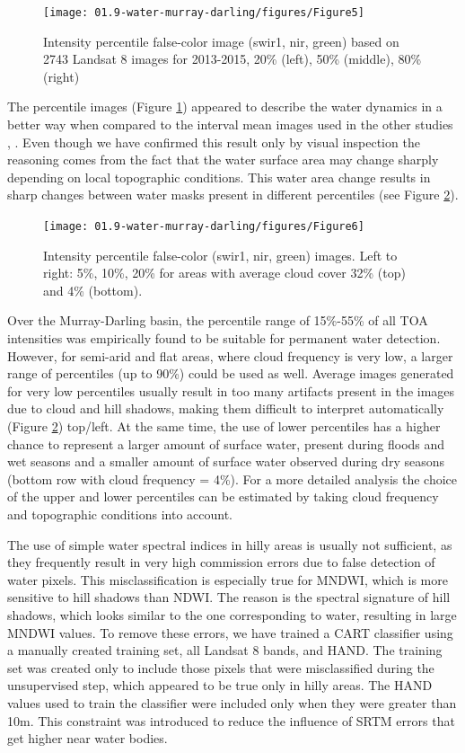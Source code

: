 \begin{figure}
	\centering
	\texttt{[image: 01.9-water-murray-darling/figures/Figure5]}
	\caption{Intensity percentile false-color image (swir1, nir, green) based on 2743 Landsat 8 images for 2013-2015, 20\% (left), 50\% (middle), 80\% (right)}
	\label{fig:au-percentiles}
\end{figure}

The percentile images (Figure \ref{fig:au-percentiles}) appeared to describe the water dynamics in a better way when  compared to the interval mean images used in the other studies \citet{Potapov2012}, \citet{Hansen2013}. Even though we have confirmed this result only by visual inspection the reasoning comes from the fact that the water surface area may change sharply depending on local topographic conditions. This water area change results in sharp changes between water masks present in different percentiles (see Figure \ref{fig:au-percentiles-clouds}). 

\begin{figure}
	\centering
	\texttt{[image: 01.9-water-murray-darling/figures/Figure6]}
	\caption{Intensity percentile false-color (swir1, nir, green) images. Left to right: 5\%, 10\%, 20\% for areas with average cloud cover 32\% (top) and 4\% (bottom). }
	\label{fig:au-percentiles-clouds}
\end{figure}

Over the Murray-Darling basin, the percentile range of 15\%-55\% of all TOA intensities was empirically found to be suitable for permanent water detection. However, for semi-arid and flat areas, where cloud frequency is very low, a larger range of percentiles (up to 90\%) could be used as well. Average images generated for very low percentiles usually result in too many artifacts present in the images due to cloud and hill shadows, making them difficult to interpret automatically (Figure \ref{fig:au-percentiles-clouds}) top/left. At the same time, the use of lower percentiles has a higher chance to represent a larger amount of surface water, present during floods and wet seasons and a smaller amount of surface water observed during dry seasons (bottom row with cloud frequency = 4\%). For a more detailed analysis the choice of the upper and lower percentiles can be estimated by taking cloud frequency and topographic conditions into account.

The use of simple water spectral indices in hilly areas is usually not sufficient, as they frequently result in very high commission errors due to false detection of water pixels. This misclassification is especially true for MNDWI, which is more sensitive to hill shadows than NDWI. The reason is the spectral signature of hill shadows, which looks similar to the one corresponding to water, resulting in large MNDWI values. To remove these errors, we have trained a CART classifier using a manually created training set, all Landsat 8 bands, and HAND. The training set was created only to include those pixels that were misclassified during the unsupervised step, which appeared to be true only in hilly areas. The HAND values used to train the classifier were included only when they were greater than 10m. This constraint was introduced to reduce the influence of SRTM errors that get higher near water bodies.

